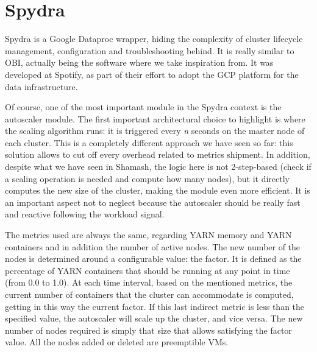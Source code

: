 \documentclass[12pt,twoside,cucitura]{toptesi}
\begin{document}
\section{Spydra}
Spydra \cite{spydra} is a Google Dataproc wrapper, hiding the complexity of cluster lifecycle management, configuration and troubleshooting behind. It is really similar to OBI, actually being the software where we take inspiration from. It was developed at Spotify, as part of their effort to adopt the GCP platform for the data infrastructure.

Of course, one of the most important module in the Spydra context is the autoscaler module. The first important architectural choice to highlight is where the scaling algorithm runs: it is triggered every \textit{n} seconds on the master node of each cluster. This is a completely different approach we have seen so far: this solution allows to cut off every overhead related to metrics shipment. In addition, despite what we have seen in Shamash, the logic here is not 2-step-based (check if a scaling operation is needed and compute how many nodes), but it directly computes the new size of the cluster, making the module even more efficient. It is an important aspect not to neglect because the autoscaler should be really fast and reactive following the workload signal.

The metrics used are always the same, regarding YARN memory and YARN containers and in addition the number of active nodes. The new number of the nodes is determined around a configurable value: the factor. It is defined as the percentage of YARN containers that should be running at any point in time (from 0.0 to 1.0). At each time interval, based on the mentioned metrics, the current number of containers that the cluster can accommodate is computed, getting in this way the current factor. If this last indirect metric is less than the specified value, the autoscaler will scale up the cluster, and vice versa. The new number of nodes required is simply that size that allows satisfying the factor value. All the nodes added or deleted are preemptible VMs.
\end{document}
